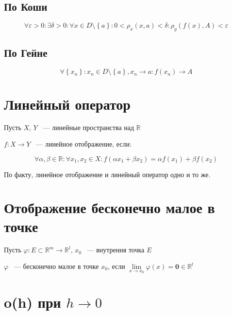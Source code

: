 \documentclass{article}
\begin{document}
        \subsection{По Коши}
        
            $$\forall \varepsilon > 0 : \exists \delta > 0 : \forall x \in D \setminus \left\{a \right\} : 0 < \rho_x (x, a) < \delta : \rho_y (f(x), A) < \varepsilon$$
            
        \subsection{По Гейне}
        
            $$\forall \left\{ x_n \right\} : x_n \in D \setminus \left\{ a \right\}, x_n \rightarrow a : f(x_n) \rightarrow A$$
            
    \newpage
    
    \section{Линейный оператор}
    
        Пусть $X$, $Y$ ~--- линейные пространства над $\mathbb{R}$
        
        $f: X \rightarrow Y$ ~--- линейное отображение, если:
        
        $$\forall \alpha, \beta \in \mathbb{R} : \forall x_1, x_2 \in X : f(\alpha x_1 + \beta x_2) = \alpha f(x_1) + \beta f(x_2)$$
        
        По факту, линейное отображение и линейный оператор одно и то же.
        
    \newpage
    
    \section{Отображение бесконечно малое в точке}
    
        Пусть $\varphi : E \subset \mathbb{R}^m \rightarrow \mathbb{R}^l$, $x_0$ ~--- внутрення точка $E$
        
        $\varphi$ ~--- бесконечно малое в точке $x_0$, если $\lim\limits_{x \rightarrow x_0} \varphi(x) = \mathbf{0} \in \mathbb{R}^l$
        
    \newpage
    
    \section{o(h) при $h \rightarrow 0$}
    
\end{document}
